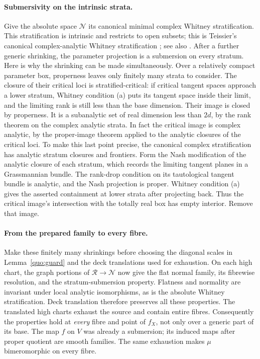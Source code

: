 \paragraph{Submersivity on the intrinsic strata.}
Give the absolute space \(\mathcal N\) its canonical minimal complex Whitney
stratification. This stratification is intrinsic and restricts
to open subsets; this is Teissier's canonical complex-analytic Whitney
stratification \cite[VI, \S3, Propositions~3.1--3.2]{Teissier1982};
see also \cite[\S4.3, following Theorem~4.13]{GilesFloresTeissier2018}. After a further generic
shrinking, the parameter projection is a submersion on every
stratum. Here is why the shrinking can be made simultaneously.
Over a relatively compact parameter box, properness leaves only
finitely many strata to consider. The closure of their critical
loci is stratified-critical: if critical tangent spaces approach
a lower stratum, Whitney condition (a) puts its tangent space
inside their limit, and the limiting rank is still less than
the base dimension. Their image is closed by properness. It is
a subanalytic set of real dimension less than \(2d\), by the
rank theorem on the complex analytic strata. In fact the critical
image is complex analytic, by the proper-image theorem applied
to the analytic closures of the critical loci. To make this last
point precise, the canonical complex stratification has analytic
stratum closures and frontiers. Form the Nash modification of
the analytic closure of each stratum, which records the limiting
tangent planes in a Grassmannian bundle. The rank-drop condition
on its tautological tangent bundle is analytic, and the Nash
projection is proper. Whitney condition (a) gives the asserted
containment at lower strata after projecting back.
Thus the critical image's intersection
with the totally real box has empty interior. Remove that image.

\paragraph{From the prepared family to every fibre.}
Make these finitely many shrinkings before choosing the diagonal
scales in Lemma~\ref{quo:guard} and the deck translations used
for exhaustion. On each high chart, the graph portions of
\(\mathcal R\to\mathcal N\) now give the flat normal family,
its fibrewise resolution, and the stratum-submersion property.
Flatness and normality are invariant under local analytic
isomorphisms, as is the absolute Whitney stratification. Deck
translation therefore preserves all these properties.
The translated high charts exhaust the source and contain
entire fibres. Consequently the properties hold at
\emph{every} fibre and point of \(f_X\), not only over a
generic part of its base. The map \(f\) on \(V\) was already
a submersion; its induced maps after proper quotient are smooth
families. The same exhaustion makes \(\mu\) bimeromorphic on
every fibre.

